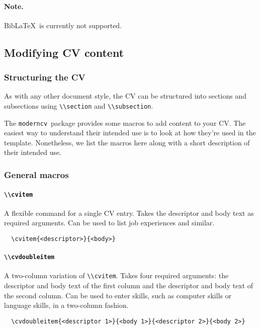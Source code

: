 \documentclass[a4paper, 11pt]{article}
\newcommand{\note}{\paragraph{Note.}}
\newcommand{\code}[1]{\lstinline!#1!}
\newcommand{\moderncv}{\code{moderncv}}
\newcommand{\Moderncv}{\moderncv~}
\newcommand{\biblatex}{BibLaTeX}
\newcommand{\Biblatex}{\biblatex~}
\begin{document}
\note \Biblatex is currently not supported.

\subsection{Modifying CV content}
\subsubsection{Structuring the CV}
As with any other document style, the CV can be structured into sections and subsections using \code{\\section} and \code{\\subsection}.

The \Moderncv package provides some macros to add content to your CV.
The easiest way to understand their intended use is to look at how they're used in the template.
Nonetheless, we list the macros here along with a short description of their intended use.

\subsubsection{General macros}

\paragraph{\code{\\cvitem}}
A flexible command for a single CV entry.
Takes the descriptor and body text as required arguments.
Can be used to list job experiences and similar.
\begin{lstlisting}
  \cvitem{<descriptor>}{<body>}
\end{lstlisting}

\paragraph{\code{\\cvdoubleitem}}
A two-column variation of \code{\\cvitem}.
Takes four required arguments: the descriptor and body text of the first column and the descriptor and body text of the second column.
Can be used to enter skills, such as computer skills or language skills, in a two-column fashion.
\begin{lstlisting}
  \cvdoubleitem{<descriptor 1>}{<body 1>}{<descriptor 2>}{<body 2>}
\end{lstlisting}
\end{document}
